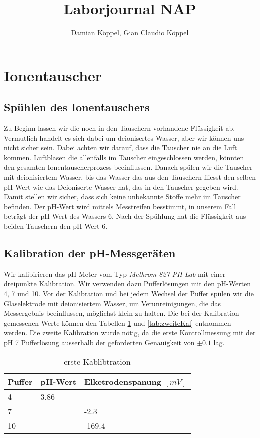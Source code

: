 \documentclass[10pt,oneside,a4paper,fleqn]{article}
\title{Laborjournal NAP}
\author{Damian Köppel, Gian Claudio Köppel}
\begin{document}
\maketitle

\section{Ionentauscher}

\subsection{Spühlen des Ionentauschers}

Zu Beginn lassen wir die noch in den Tauschern vorhandene Flüssigkeit ab.
Vermutlich handelt es sich dabei um deionisertes Wasser, aber wir können uns
nicht sicher sein. Dabei achten wir darauf, dass die Tauscher nie an die Luft
kommen. Luftblasen die allenfalls im Tauscher eingeschlossen werden,
könnten den gesamten Ionentauscherprozess beeinflussen. Danach spülen wir die
Tauscher mit deionisiertem Wasser, bis das Wasser das aus den Tauschern fliesst
den selben pH-Wert wie das Deioniserte Wasser hat, das in den Tauscher gegeben
wird. Damit stellen wir sicher, dass sich keine unbekannte Stoffe mehr im
Tauscher befinden. Der pH-Wert wird mittels Messtreifen besstimmt, in unserem
Fall beträgt der pH-Wert des Wassers 6. Nach der Spühlung hat die Flüssigkeit
aus beiden Tauschern den pH-Wert 6.

\subsection{Kalibration der pH-Messgeräten}
Wir kalibirieren das pH-Meter vom Typ \textit{Methrom 827 PH Lab} mit
einer dreipunkte Kalibration. Wir verwenden dazu Pufferlösungen
mit den pH-Werten 4, 7 und 10. Vor der Kalibration und bei jedem Wechsel der
Puffer spülen wir die Glaselektrode mit deionisiertem Wasser, um
Verunreinigungen, die das Messergebnis beeinflussen, möglichst klein zu halten.
Die bei der Kalibration gemessenen Werte können den Tabellen \ref{tab:ersteKal}
und \ref{tab:zweiteKal} entnommen werden.
Die zweite Kalibration wurde nötig, da die erste Kontrollmessung mit der pH 7
Pufferlösung ausserhalb der geforderten Genauigkeit von $\pm 0.1$ lag.

\begin{table}[!h]
\caption{erste Kablibtration}
\label{tab:ersteKal}
\centering
	\begin{tabular}{|l|l|l|}
		\hline
		Puffer & pH-Wert & Elketrodenspanung $\left[mV\right]$\\
		\hline
		4 & 3.86 &\\
		\hline
		7 &  & -2.3\\
		\hline
		10 &  & -169.4\\
		\hline
	\end{tabular}
\end{table}
\end{document}
